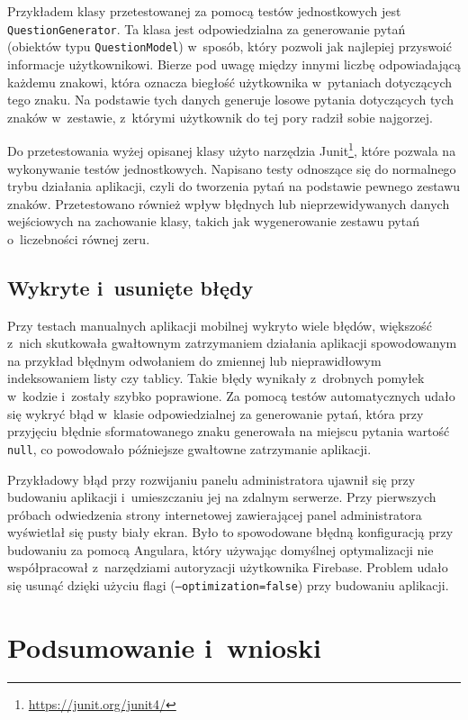 \documentclass[a4paper,twoside,12pt]{book}
\begin{document}
Przykładem klasy przetestowanej za pomocą testów jednostkowych jest \texttt{QuestionGenerator}. Ta klasa jest odpowiedzialna za generowanie pytań (obiektów typu \texttt{QuestionModel}) w~sposób, który pozwoli jak najlepiej przyswoić informacje użytkownikowi. Bierze pod uwagę między innymi liczbę odpowiadającą każdemu znakowi, która oznacza biegłość użytkownika w~pytaniach dotyczących tego znaku. Na podstawie tych danych generuje losowe pytania dotyczących tych znaków w~zestawie, z~którymi użytkownik do tej pory radził sobie najgorzej. 

Do przetestowania wyżej opisanej klasy użyto narzędzia Junit\footnote{\url{https://junit.org/junit4/}}, które pozwala na wykonywanie testów jednostkowych. Napisano testy odnoszące się do normalnego trybu działania aplikacji, czyli do tworzenia pytań na podstawie pewnego zestawu znaków. Przetestowano również wpływ błędnych lub nieprzewidywanych danych wejściowych na zachowanie klasy, takich jak wygenerowanie zestawu pytań o~liczebności równej zeru. 

\section{Wykryte i~usunięte błędy}

Przy testach manualnych aplikacji mobilnej wykryto wiele błędów, większość z~nich skutkowała gwałtownym zatrzymaniem działania aplikacji spowodowanym na przykład błędnym odwołaniem do zmiennej lub nieprawidłowym indeksowaniem listy czy tablicy. Takie błędy wynikały z~drobnych pomyłek w~kodzie i~zostały szybko poprawione. Za pomocą testów automatycznych udało się wykryć błąd w~klasie odpowiedzialnej za generowanie pytań, która przy przyjęciu błędnie sformatowanego znaku generowała na miejscu pytania wartość \texttt{null}, co powodowało późniejsze gwałtowne zatrzymanie aplikacji.

Przykładowy błąd przy rozwijaniu panelu administratora ujawnił się przy budowaniu aplikacji i~umieszczaniu jej na zdalnym serwerze. Przy pierwszych próbach odwiedzenia strony internetowej zawierającej panel administratora wyświetlał się pusty biały ekran. Było to spowodowane błędną konfiguracją przy budowaniu za pomocą Angulara, który używając domyślnej optymalizacji nie współpracował z~narzędziami autoryzacji użytkownika Firebase. Problem udało się usunąć dzięki użyciu flagi (\texttt{--optimization=false}) przy budowaniu aplikacji.

\chapter{Podsumowanie i~wnioski}
\end{document}
